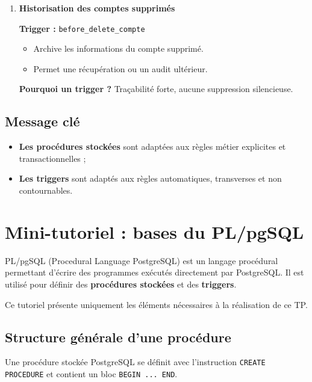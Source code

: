 \documentclass[11pt]{article}
\begin{document}
\begin{enumerate}
\textbf{Pourquoi un trigger ?}
Évite des calculs coûteux répétés côté application.

\item \textbf{Historisation des comptes supprimés}

\textbf{Trigger :} \texttt{before\_delete\_compte}

\begin{itemize}
    \item Archive les informations du compte supprimé.
    \item Permet une récupération ou un audit ultérieur.
\end{itemize}

\textbf{Pourquoi un trigger ?}
Traçabilité forte, aucune suppression silencieuse.

\end{enumerate}

\subsection*{Message clé}

\begin{itemize}
\item \textbf{Les procédures stockées} sont adaptées aux règles métier explicites et transactionnelles ;
\item \textbf{Les triggers} sont adaptés aux règles automatiques, transverses et non contournables.
\end{itemize}
        

\section*{Mini-tutoriel : bases du PL/pgSQL}

PL/pgSQL (Procedural Language PostgreSQL) est un langage procédural permettant
d’écrire des programmes exécutés directement par PostgreSQL.
Il est utilisé pour définir des \textbf{procédures stockées} et des \textbf{triggers}.

Ce tutoriel présente uniquement les éléments nécessaires à la réalisation de ce TP.

\bigskip

\subsection*{Structure générale d’une procédure}

Une procédure stockée PostgreSQL se définit avec l’instruction
\texttt{CREATE PROCEDURE} et contient un bloc \texttt{BEGIN ... END}.
\end{document}
